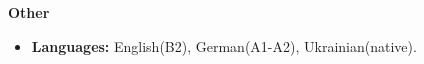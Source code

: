 {
    {\vspace{0.5cm} \hspace{-0.5cm} \Large \textbf{Other}}

    \begin{itemize}
        \item \textbf{Languages:} English(B2), German(A1-A2), Ukrainian(native).
    \end{itemize}
}
